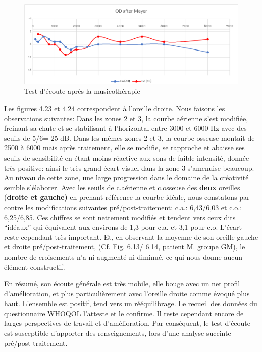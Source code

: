  	\begin{figure}[h]
 		\centering

 		\includegraphics[width=0.7\linewidth]{images/clinique/od_after_meyer.png}
 		\caption{Test d'écoute après la musicothérapie}
 		\label{fig:odaftermeyer}
 	\end{figure}
 Les figures 4.23 et 4.24 correspondent à l'oreille droite.
        Nous faisons les observations suivantes:
      Dans les
        zones 2 et 3,  la courbe aérienne s'est modifiée, freinant sa
        chute et se stabilisant à l'horizontal entre 3000 et 6000 Hz
        avec des seuils de 5/6= 25 dB.
        Dans les mêmes zones 2 et 3, la
        courbe osseuse montait de 2500 à 6000 mais après traitement,
        elle se modifie, se rapproche et abaisse ses seuils de
        sensibilité en étant moins réactive aux sons de faible
        intensité, donnée très positive: ainsi le très grand écart visuel dans la zone 3 s'amenuise beaucoup. Au niveau de cette
        zone, une large progression dans
  le domaine de la créativité semble s'élaborer.
Avec les
  seuils
   de c.aérienne et c.osseuse des\textbf{ deux} oreilles (\textbf{droite et gauche)} en prenant
   référence la courbe idéale, nous
  constatons par contre les modifications suivantes pré/post-traitement:
  c.a.: 6,43/6,03 et c.o.: 6,25/6,85.
  Ces chiffres se sont nettement
  modifiés et tendent vers
  ceux dits ``idéaux''  qui équivalent aux environs de 1,3 pour
  c.a. et 3,1 pour c.o. L'écart reste cependant très important. %
  Et, en observant la moyenne de son oreille gauche et droite
  pré/post-traitement, (Cf. Fig. 6.13/ 6.14, patient M. groupe GM), le
  nombre de croisements n'a ni augmenté ni diminué, ce qui nous donne
  aucun élément constructif.

  En résumé, son écoute générale est très mobile, elle bouge avec un
  net profil d'amélioration, et plus particulièrement avec l'oreille
  droite comme évoqué plus haut. L'ensemble est positif, tend vers un
  rééquilibrage. Le recueil des données du
  questionnaire WHOQOL l'atteste et le confirme.
  Il reste cependant encore de larges perspectives de travail et d'amélioration.
  Par conséquent, le test d'écoute est susceptible d'apporter des renseignements, lors
      d'une analyse succinte pré/post-traitement.
















